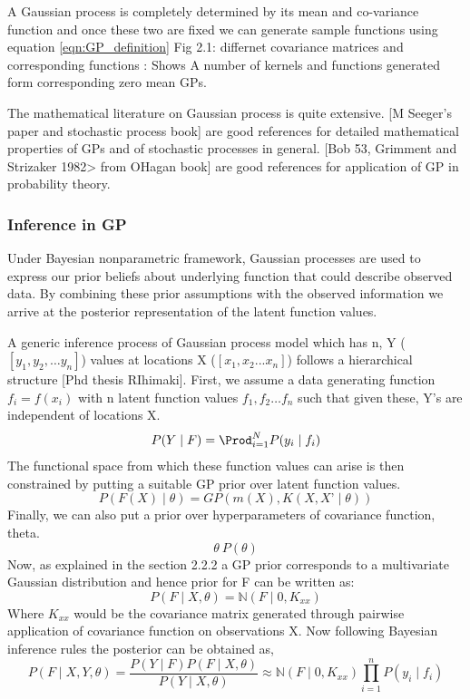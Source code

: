 A Gaussian process is completely determined by its mean and co-variance function and once these two are fixed we can generate sample functions using equation \ref{eqn:GP_definition}  Fig 2.1: differnet covariance matrices and corresponding functions :  Shows A number of kernels and functions generated form corresponding  zero mean GPs. 

The mathematical literature on Gaussian process is quite extensive. [M Seeger’s paper and stochastic process book] are good references for detailed mathematical properties of GPs and of stochastic processes in general. [Bob 53, Grimment and Strizaker 1982> from OHagan book] are good references for application of GP in probability theory.

\subsubsection{Inference in GP}
Under Bayesian nonparametric framework, Gaussian processes are used to express our prior beliefs about underlying function that could describe observed data. By combining these prior assumptions with the observed information we arrive at the posterior representation of the latent function values.

A generic inference process of Gaussian process model which has n, Y ($[y_1,y_2,…y_n]$) values at locations X ($[x_1,x_2...x_n ]$) follows a hierarchical structure [Phd thesis RIhimaki]. 
First, we assume a data generating function $f_i = f(x_i)$ with n latent function values $f_1,f_2…f_n$ such that given these, Y’s are independent of locations X.
$$P(Y \mid F) = \Prod_{i=1}^{N}P(y_i \mid f_i)$$
The functional space from which these function values can arise is then constrained by putting a suitable GP prior over latent function values. $$ P(F(X) \mid \theta) = GP(m(X),K(X,X’ \mid \theta))$$
Finally, we can also put a prior over hyperparameters of covariance function, theta. 
	$$\theta ~ P(\theta)$$ 
Now, as explained in the section 2.2.2 a GP prior corresponds to a multivariate Gaussian distribution and hence prior for F can be written as:
$$P(F \mid X,\theta) = \mathbb{N}(F \mid 0, K_{xx})$$
Where $K_{xx}$ would be the covariance matrix generated through pairwise application of covariance function on observations X. Now following Bayesian inference rules the posterior can be obtained as,
\begin{equation}
P(F \mid X,Y,\theta) = \frac{P(Y \mid F)P(F \mid X, \theta)}{P(Y \mid X, \theta)} \approx \mathbb{N}(F \mid 0, K_{xx}) \prod_{i=1}^{n}P(y_i \mid f_i)
\label{eqn:GP_posterior}
\end{equation}

